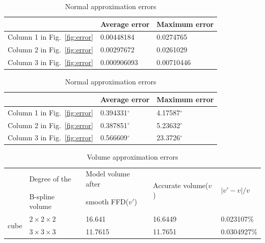\documentclass[3p]{elsarticle}
\begin{document}
\begin{table}[htbp]
\begin{center}
	\begin{minipage}[c]{0.47\textwidth}
	\footnotesize
	\centering
	\caption{Geometry approximation errors}
	\begin{tabular}{lll}
		\hline
		& Average error & Maximum error \\
		\hline
			Column 1 in Fig.~\ref{fig:error} & 0.00448184 & 0.0274765 \\
			Column 2 in Fig.~\ref{fig:error} & 0.00297672 & 0.0261029 \\
			Column 3 in Fig.~\ref{fig:error} & 0.000906093 & 0.00710446 \\
		\hline
	\end{tabular}
	\label{tab:error_vertex}
	\end{minipage}
	\begin{minipage}[c]{0.52\textwidth}
	\footnotesize
	\centering
	\caption{Normal approximation errors}
	\begin{tabular}{lll}
		\hline
			& Average error & Maximum error \\
		\hline
			Column 1 in Fig.~\ref{fig:error} & 0.394331$^\circ$ & 4.17587$^\circ$ \\
			Column 2 in Fig.~\ref{fig:error} & 0.387851$^\circ$ & 5.23632$^\circ$ \\
			Column 3 in Fig.~\ref{fig:error} & 0.566609$^\circ$ & 23.3726$^\circ$ \\
		\hline
	\end{tabular}
	\label{tab:error_normal}
	\end{minipage}
\end{center}
\end{table}


\begin{table}[htbp]
	\centering
	\footnotesize
	\caption{Volume approximation errors}
	\begin{tabular}{lllll}
		\hline
			& Degree of the & Model volume after &
			\multirow{2}{*}{Accurate volume($v$)} & \multirow{2}{*}{$\left | v'-v \right| / v$} \\
			& B-spline volume & smooth FFD($v'$) & \multirow{2}{*}{} & \multirow{2}{*}{} \\
		\hline
			\multirow{2}{*}{cube} & $2\times2\times2$ & 16.641 & 16.6449 & 0.023107\% \\
			\multirow{2}{*}{}	  & $3\times3\times3$ & 11.7615 & 11.7651 & 0.0304927\% \\
		\hline
	\end{tabular}
	\label{tab:error_volume}
\end{table}
\end{document}
